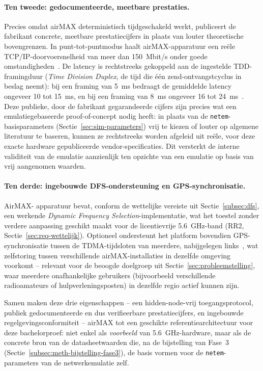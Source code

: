 \paragraph{Ten tweede: gedocumenteerde, meetbare prestaties.} Precies omdat airMAX
deterministisch tijdgeschakeld werkt, publiceert de fabrikant concrete, meetbare
prestatiecijfers in plaats van louter theoretische bovengrenzen. In
punt-tot-puntmodus haalt airMAX-apparatuur een reële TCP/IP-doorvoersnelheid van meer
dan 150~Mbit/s onder goede omstandigheden~\autocite{AirMaxTDMA}. De latency is
rechtstreeks gekoppeld aan de ingestelde TDD-framingduur (\textit{Time Division
Duplex}, de tijd die één zend-ontvangstcyclus in beslag neemt): bij een framing van
5~ms bedraagt de gemiddelde latency ongeveer 10 tot 15~ms, en bij een framing van 8~ms
ongeveer 16 tot 24~ms~\autocite{UISPGPSSync}. Deze publieke, door de fabrikant
gegarandeerde cijfers zijn precies wat een emulatiegebaseerde proof-of-concept nodig
heeft: in plaats van de \texttt{netem}-basisparameters (Sectie~\ref{sec:sim-parameters})
vrij te kiezen of louter op algemene literatuur te baseren, kunnen ze rechtstreeks
worden afgeleid uit reële, voor deze exacte hardware gepubliceerde
vendor-specificaties. Dit versterkt de interne validiteit van de emulatie aanzienlijk
ten opzichte van een emulatie op basis van vrij aangenomen waarden.

\paragraph{Ten derde: ingebouwde DFS-ondersteuning en GPS-synchronisatie.} AirMAX-
apparatuur bevat, conform de wettelijke vereiste uit Sectie~\ref{subsec:dfs}, een
werkende \textit{Dynamic Frequency Selection}-implementatie, wat het toestel zonder
verdere aanpassing geschikt maakt voor de licentievrije 5.6~GHz-band (RR2,
Sectie~\ref{sec:req-wettelijk}). Optioneel ondersteunt het platform bovendien
GPS-synchronisatie tussen de TDMA-tijdsloten van meerdere, nabijgelegen
links~\autocite{UISPGPSSync}, wat zelfstoring tussen verschillende airMAX-installaties
in dezelfde omgeving voorkomt -- relevant voor de beoogde doelgroep uit
Sectie~\ref{sec:probleemstelling}, waar meerdere onafhankelijke gebruikers (bijvoorbeeld
verschillende radioamateurs of hulpverleningsposten) in dezelfde regio actief kunnen
zijn.

Samen maken deze drie eigenschappen -- een hidden-node-vrij toegangsprotocol,
publiek gedocumenteerde en dus verifieerbare prestatiecijfers, en ingebouwde
regelgevingsconformiteit -- airMAX tot een geschikte referentiearchitectuur voor deze
bachelorproef: niet enkel als \emph{voorbeeld} van 5.6~GHz-hardware, maar als de
concrete bron van de datasheetwaarden die, na de bijstelling van Fase~3
(Sectie~\ref{subsec:meth-bijstelling-fase3}), de basis vormen voor de
\texttt{netem}-parameters van de netwerkemulatie zelf.

